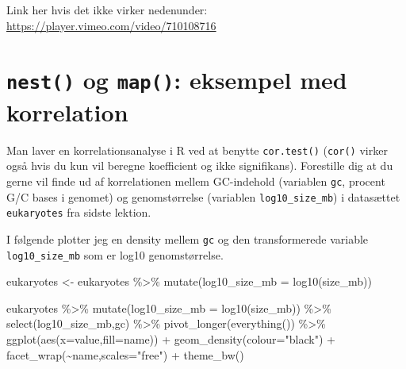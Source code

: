 \documentclass[
]{book}
\newenvironment{Shaded}{\begin{snugshade}}{\end{snugshade}}
\newcommand{\AttributeTok}[1]{\textcolor[rgb]{0.77,0.63,0.00}{#1}}
\newcommand{\FunctionTok}[1]{\textcolor[rgb]{0.00,0.00,0.00}{#1}}
\newcommand{\NormalTok}[1]{#1}
\newcommand{\OtherTok}[1]{\textcolor[rgb]{0.56,0.35,0.01}{#1}}
\newcommand{\SpecialCharTok}[1]{\textcolor[rgb]{0.00,0.00,0.00}{#1}}
\newcommand{\StringTok}[1]{\textcolor[rgb]{0.31,0.60,0.02}{#1}}
\begin{document}
Link her hvis det ikke virker nedenunder: \url{https://player.vimeo.com/video/710108716}

\hypertarget{nest-og-map-eksempel-med-korrelation}{%
\section{\texorpdfstring{\texttt{nest()} og \texttt{map()}: eksempel med korrelation}{nest() og map(): eksempel med korrelation}}\label{nest-og-map-eksempel-med-korrelation}}

Man laver en korrelationsanalyse i R ved at benytte \texttt{cor.test()} (\texttt{cor()} virker også hvis du kun vil beregne koefficient og ikke signifikans). Forestille dig at du gerne vil finde ud af korrelationen mellem GC-indehold (variablen \texttt{gc}, procent G/C bases i genomet) og genomstørrelse (variablen \texttt{log10\_size\_mb}) i datasættet \texttt{eukaryotes} fra sidste lektion.

I følgende plotter jeg en density mellem \texttt{gc} og den transformerede variable \texttt{log10\_size\_mb} som er log10 genomstørrelse.

\begin{Shaded}
\begin{Highlighting}[]
\NormalTok{eukaryotes }\OtherTok{\textless{}{-}}\NormalTok{ eukaryotes }\SpecialCharTok{\%\textgreater{}\%} 
  \FunctionTok{mutate}\NormalTok{(}\AttributeTok{log10\_size\_mb =} \FunctionTok{log10}\NormalTok{(size\_mb))}
\end{Highlighting}
\end{Shaded}

\begin{Shaded}
\begin{Highlighting}[]
\NormalTok{eukaryotes }\SpecialCharTok{\%\textgreater{}\%} 
  \FunctionTok{mutate}\NormalTok{(}\AttributeTok{log10\_size\_mb =} \FunctionTok{log10}\NormalTok{(size\_mb)) }\SpecialCharTok{\%\textgreater{}\%}
  \FunctionTok{select}\NormalTok{(log10\_size\_mb,gc) }\SpecialCharTok{\%\textgreater{}\%} 
  \FunctionTok{pivot\_longer}\NormalTok{(}\FunctionTok{everything}\NormalTok{()) }\SpecialCharTok{\%\textgreater{}\%}
  \FunctionTok{ggplot}\NormalTok{(}\FunctionTok{aes}\NormalTok{(}\AttributeTok{x=}\NormalTok{value,}\AttributeTok{fill=}\NormalTok{name)) }\SpecialCharTok{+} 
  \FunctionTok{geom\_density}\NormalTok{(}\AttributeTok{colour=}\StringTok{"black"}\NormalTok{) }\SpecialCharTok{+}
  \FunctionTok{facet\_wrap}\NormalTok{(}\SpecialCharTok{\textasciitilde{}}\NormalTok{name,}\AttributeTok{scales=}\StringTok{"free"}\NormalTok{) }\SpecialCharTok{+}
  \FunctionTok{theme\_bw}\NormalTok{()}
\end{Highlighting}
\end{Shaded}
\end{document}
